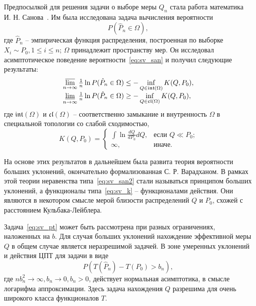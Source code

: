 \documentclass[12pt, specialist, subf, substylefile = spbu.rtx]{disser}
\DeclareMathOperator*{\toplim}{\overline\lim}
\DeclareMathOperator*{\botlim}{\underline\lim}
\begin{document}
Предпосылкой для решения задачи о выборе меры $Q_n$ стала работа математика И. Н. Санова~\cite{Sanov1957}. Им была исследована задача вычисления вероятности 
\begin{equation}\label{eq:sv_san}
P(\hat{P}_n \in \Omega),
\end{equation}
где $\hat{P}_n$ -- эмпирическая функция распределения, построенная по выборке $X_i \sim P_0, 1 \le i \le n$; $\Omega$ принадлежит пространству мер. Он исследовал асимптотическое поведение вероятности~\eqref{eq:sv_san} и получил следующие результаты:
\begin{equation}\label{eq:sv_san2}
\begin{tabular}{l}
$\toplim\limits_{n \to \infty} \frac{1}{n} \ln P(\hat{P}_n \in \Omega) \le -\inf\limits_{Q\in \mathfrak{int}(\Omega)} K(Q, P_0),$
\\
$\botlim\limits_{n \to \infty} \frac{1}{n} \ln P(\hat{P}_n \in \Omega) \ge -\inf\limits_{Q\in \mathfrak{cl}(\Omega)} K(Q, P_0),$
\end{tabular}
\end{equation}
где $\mathfrak{int}(\Omega)$ и $\mathfrak{cl}(\Omega)$ -- соответственно замыкание и внутренность $\Omega$ в специальной топологии со слабой сходимостью, 
\begin{equation}\label{eq:sv_k}
K(Q, P_0)=
\begin{cases}
\int \ln \frac{dQ}{dP_0}dQ, 
	&\text{если $Q \ll P_0$;}\\
\infty,	
	&\text{иначе.}
\end{cases}
\end{equation}

На основе этих результатов в дальнейшем была развита теория вероятности больших уклонений, окончательно формализованная С. Р. Варадханом. В рамках этой теории неравенства типа~\eqref{eq:sv_san2} стали называться принципом больших уклонений, а функционалы типа~\eqref{eq:sv_k}
-- функционалами действия. Они являются в некотором смысле мерой близости распределений $Q$ и $P_0$, схожей с расстоянием Кульбака-Лейблера.

Задача~\eqref{eq:sv_pt} может быть рассмотрена при разных ограничениях, наложенных на $b$. Для случая больших уклонений нахождение эффективной меры $Q$ в общем случае является неразрешимой задачей. В зоне умеренных уклонений и действия ЦПТ для задачи в виде
\begin{equation}\label{eq:sv_ptum}
P(T(\hat{P}_n)-T(P_0) > b_n), 
\end{equation}
где $nb_n^2 \to \infty, b_n \to 0, b_n > 0$, действует нормальная асимптотика, в смысле логарифма аппроксимации. Здесь задача нахождения $Q$ разрешима для очень широкого класса функционалов $T$.
\end{document}
